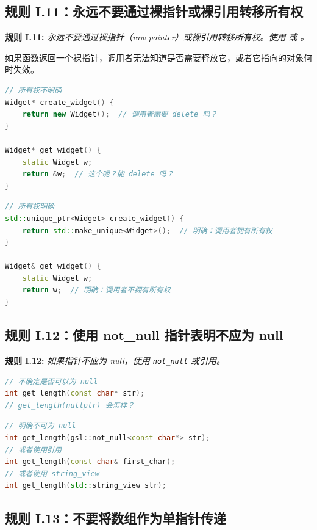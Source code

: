 \subsection{规则 I.11：永远不要通过裸指针或裸引用转移所有权}

\textbf{规则 I.11:} \textit{永远不要通过裸指针（raw pointer）或裸引用转移所有权。使用 \texttt{} 或 \texttt{}。}

如果函数返回一个裸指针，调用者无法知道是否需要释放它，或者它指向的对象何时失效。

\begin{lstlisting}[language=C++]
// 所有权不明确
Widget* create_widget() {
    return new Widget();  // 调用者需要 delete 吗？
}

Widget* get_widget() {
    static Widget w;
    return &w;  // 这个呢？能 delete 吗？
}
\end{lstlisting}

\begin{lstlisting}[language=C++]
// 所有权明确
std::unique_ptr<Widget> create_widget() {
    return std::make_unique<Widget>();  // 明确：调用者拥有所有权
}

Widget& get_widget() {
    static Widget w;
    return w;  // 明确：调用者不拥有所有权
}
\end{lstlisting}

\subsection{规则 I.12：使用 not\_null 指针表明不应为 null}

\textbf{规则 I.12:} \textit{如果指针不应为 null，使用 \texttt{not\_null} 或引用。}

\begin{lstlisting}[language=C++]
// 不确定是否可以为 null
int get_length(const char* str);
// get_length(nullptr) 会怎样？
\end{lstlisting}

\begin{lstlisting}[language=C++]
// 明确不可为 null
int get_length(gsl::not_null<const char*> str);
// 或者使用引用
int get_length(const char& first_char);
// 或者使用 string_view
int get_length(std::string_view str);
\end{lstlisting}

\subsection{规则 I.13：不要将数组作为单指针传递}

